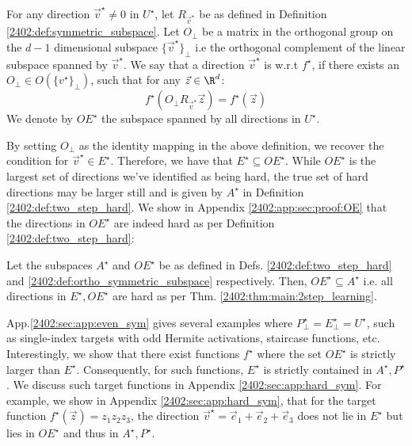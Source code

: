 \begin{definition}\label{2402:def:ortho_symmetric_subspace}
   For any direction $\vec{v}^\star \neq 0$ in $U^\star$, let $R_{\vec{v}^\star}$ be as defined in Definition \ref{2402:def:symmetric_subspace}. Let $O_{\perp}$ be a matrix in the orthogonal group on the $d-1$ dimensional subspace $\{\vec v^\star\}_\perp$ i.e the orthogonal complement of the linear subspace spanned by $\vec{v}^\star$.
        We say that a direction $\vec{v}^\star$ is  w.r.t $f^\star$, if there exists an $O_{\perp} \in O(\{v^\star\}_\perp)$, such that for any $\vec{z} \in \R^d$:
    \begin{equation}
        f^\star(O_{\perp}R_{\vec{v}^\star} \vec{z})= f^\star(\vec{z})
    \end{equation}
    We denote by $OE^\star$ the subspace spanned by all  directions in $U^\star$.
\end{definition} 

By setting $O_{\perp}$ as the identity mapping in the above definition, we recover the condition for $\vec{v}^\star \in E^\star$. Therefore, we have that $E^\star \subseteq OE^\star$.
While $OE^\star$ is the largest set of directions we've identified as being hard, the true set of hard directions may be larger still and is given by $A^\star$ in Definition \ref{2402:def:two_step_hard}. We show in Appendix \ref{2402:app:sec:proof:OE} that the directions in $OE^\star$ are indeed hard as per Definition \ref{2402:def:two_step_hard}:
\begin{proposition}\label{2402:prop:OE}
Let the subspaces $A^\star$ and $OE^\star$  be as defined in Defs. \ref{2402:def:two_step_hard} and \ref{2402:def:ortho_symmetric_subspace} respectively. Then, $OE^\star \subseteq A^\star$ i.e. all directions in $E^\star, OE^\star$ are hard as per Thm. \ref{2402:thm:main:2step_learning}.
\end{proposition}

App.\ref{2402:sec:app:even_sym} gives several examples  where $P^\star_\perp = E_\perp^\star = U^\star$, such as single-index targets with odd Hermite activations, staircase functions, etc.
Interestingly, we show that there exist functions $f^\star$ where the set $OE^\star$ is strictly larger than $E^\star$. Consequently, for such functions, $E^\star$ is strictly contained in  $A^\star,P^\star$. We discuss such target functions in Appendix \ref{2402:sec:app:hard_sym}.
 For example, we show in Appendix \ref{2402:sec:app:hard_sym}, that for the target function $f^\star(\vec{z})= z_1z_2z_3$, the direction $\vec{v}^\star=\vec{e}_1+\vec{e}_2+\vec{e}_3$ does not lie in $E^\star$ but lies in $OE^\star$ and thus in $A^\star,P^\star$.
 


